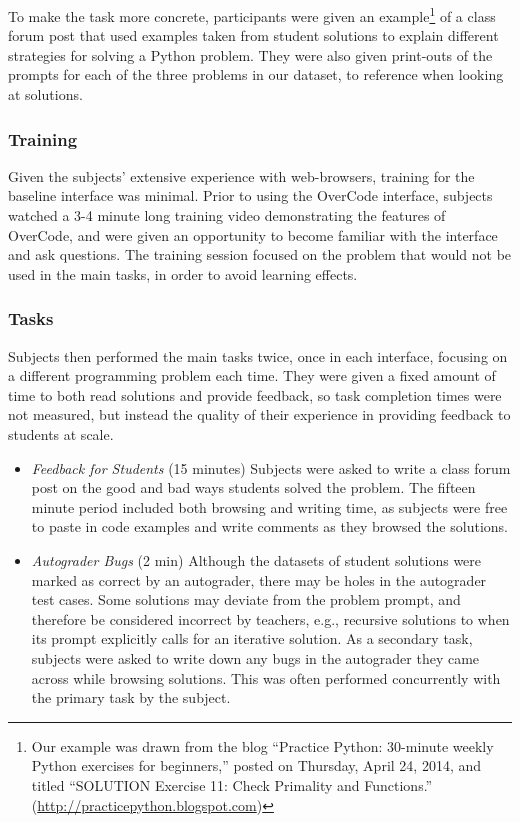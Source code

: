 To make the task more concrete, participants were given an example\footnote{Our example was drawn from the blog ``Practice Python: 30-minute weekly Python exercises for beginners,'' posted on Thursday, April 24, 2014, and titled ``SOLUTION Exercise 11: Check Primality and Functions.'' (\url{http://practicepython.blogspot.com})} of a class forum post that used examples taken from student solutions to explain different strategies for solving a Python problem. They were also given print-outs of the prompts for each of the three problems in our dataset, to reference when looking at solutions.\subsubsection{Training}

Given the subjects' extensive experience with web-browsers, training for the baseline interface was minimal. Prior to using the OverCode interface, subjects watched a 3-4 minute long training video demonstrating the features of OverCode, and were given an opportunity to become familiar with the interface and ask questions. The training session focused on the problem that would not be used in the main tasks, in order to avoid learning effects.

\subsubsection{Tasks}
Subjects then performed the main tasks twice, once in each interface, focusing on a different programming problem each time. They were given a fixed amount of time to both read solutions and provide feedback, so task completion times were not measured, but instead the quality of their experience in providing feedback to students at scale.

\begin{itemize}
\item {\it Feedback for Students} (15 minutes) Subjects were asked to write a class forum post on the good and bad ways students solved the problem. The fifteen minute period included both browsing and writing time, as subjects were free to paste in code examples and write comments as they browsed the solutions.

\item {\it Autograder Bugs} (2 min) Although the datasets of student solutions were marked as correct by an autograder, there may be holes in the autograder test cases. Some solutions may deviate from the problem prompt, and therefore be considered incorrect by teachers, e.g., recursive solutions to  when its prompt explicitly calls for an iterative solution. As a secondary task, subjects were asked to write down any bugs in the autograder they came across while browsing solutions. This was often performed concurrently with the primary task by the subject.
\end{itemize}
